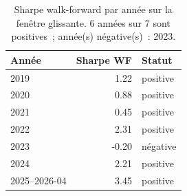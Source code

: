 \begin{table}[H]
\centering
\caption{Sharpe walk-forward par année sur la fenêtre glissante. 6 années sur 7 sont positives~; année(s) négative(s)~: 2023.}
\label{tab:walkforward_yearly}
\begin{tabular}{lrl}
\toprule
Année & Sharpe WF & Statut \\
\midrule
2019 & 1.22 & positive \\
2020 & 0.88 & positive \\
2021 & 0.45 & positive \\
2022 & 2.31 & positive \\
2023 & -0.20 & négative \\
2024 & 2.21 & positive \\
2025--2026-04 & 3.45 & positive \\
\bottomrule
\end{tabular}
\end{table}
